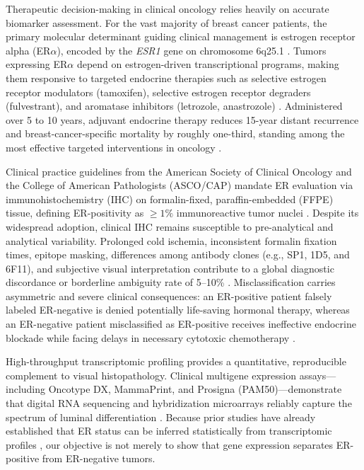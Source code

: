 \documentclass[11pt,a4paper]{article}
\begin{document}
Therapeutic decision-making in clinical oncology relies heavily on accurate biomarker assessment. For the vast majority of breast cancer patients, the primary molecular determinant guiding clinical management is estrogen receptor alpha (ER$\alpha$), encoded by the \textit{ESR1} gene on chromosome 6q25.1 \cite{r1}. Tumors expressing ER$\alpha$ depend on estrogen-driven transcriptional programs, making them responsive to targeted endocrine therapies such as selective estrogen receptor modulators (tamoxifen), selective estrogen receptor degraders (fulvestrant), and aromatase inhibitors (letrozole, anastrozole) \cite{r2}. Administered over 5 to 10 years, adjuvant endocrine therapy reduces 15-year distant recurrence and breast-cancer-specific mortality by roughly one-third, standing among the most effective targeted interventions in oncology \cite{r2}.

Clinical practice guidelines from the American Society of Clinical Oncology and the College of American Pathologists (ASCO/CAP) mandate ER evaluation via immunohistochemistry (IHC) on formalin-fixed, paraffin-embedded (FFPE) tissue, defining ER-positivity as $\ge 1\%$ immunoreactive tumor nuclei \cite{r3}. Despite its widespread adoption, clinical IHC remains susceptible to pre-analytical and analytical variability. Prolonged cold ischemia, inconsistent formalin fixation times, epitope masking, differences among antibody clones (e.g., SP1, 1D5, and 6F11), and subjective visual interpretation contribute to a global diagnostic discordance or borderline ambiguity rate of 5--10\% \cite{r4}. Misclassification carries asymmetric and severe clinical consequences: an ER-positive patient falsely labeled ER-negative is denied potentially life-saving hormonal therapy, whereas an ER-negative patient misclassified as ER-positive receives ineffective endocrine blockade while facing delays in necessary cytotoxic chemotherapy \cite{r4}.

High-throughput transcriptomic profiling provides a quantitative, reproducible complement to visual histopathology. Clinical multigene expression assays---including Oncotype DX, MammaPrint, and Prosigna (PAM50)---demonstrate that digital RNA sequencing and hybridization microarrays reliably capture the spectrum of luminal differentiation \cite{r5,r6}. Because prior studies have already established that ER status can be inferred statistically from transcriptomic profiles \cite{r6}, our objective is not merely to show that gene expression separates ER-positive from ER-negative tumors.
\end{document}
